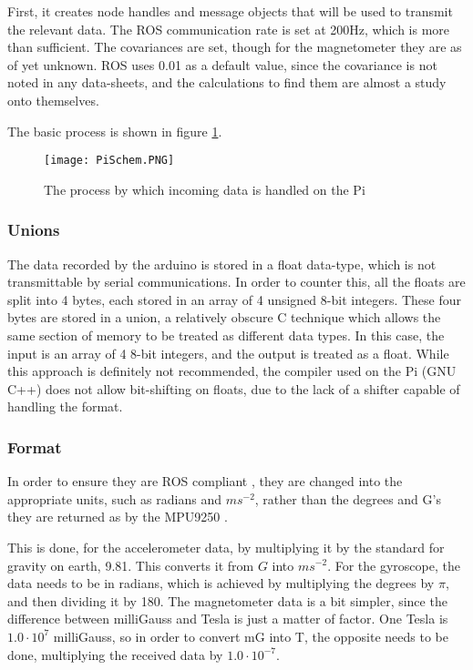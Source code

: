 First, it creates node handles and message objects that will be used to transmit the relevant data.
The ROS communication rate is set at 200Hz, which is more than sufficient.
The covariances are set, though for the magnetometer they are as of yet unknown.
ROS uses 0.01 as a default value, since the covariance is not noted in any data-sheets, and the calculations to find them are almost a study onto themselves.

The basic process is shown in figure \ref{fig::piDataReception}.

\begin{figure}[H]
\centering
\texttt{[image: PiSchem.PNG]}
\caption{The process by which incoming data is handled on the Pi}
\label{fig::piDataReception}
\end{figure}


\subsubsection{Unions} \label{sec::union}
The data recorded by the arduino is stored in a float data-type, which is not transmittable by serial communications.
In order to counter this, all the floats are split into 4 bytes, each stored in an array of 4 unsigned 8-bit integers.
These four bytes are stored in a union, a relatively obscure C technique which allows the same section of memory to be treated as different data types.
In this case, the input is an array of 4 8-bit integers, and the output is treated as a float.
While this approach is definitely not recommended, the compiler used on the Pi (GNU C++) does not allow bit-shifting on floats, due to the lack of a shifter capable of handling the format.

\subsubsection{Format}
In order to ensure they are ROS compliant \cite{ROSformat}, they are changed into the appropriate units, such as radians and $ms^{-2}$, rather than the degrees and G's they are returned as by the MPU9250 \cite{MPU9250}.

This is done, for the accelerometer data, by multiplying it by the standard for gravity on earth, 9.81.
This converts it from $G$ into $ms^{-2}$.
For the gyroscope, the data needs to be in radians, which is achieved by multiplying the degrees by $\pi$, and then dividing it by 180.
The magnetometer data is a bit simpler, since the difference between milliGauss and Tesla is just a matter of factor.
One Tesla is $1.0 \cdot 10^{7}$ milliGauss, so in order to convert mG into T, the opposite needs to be done, multiplying the received data by  $1.0 \cdot 10^{-7}$.

